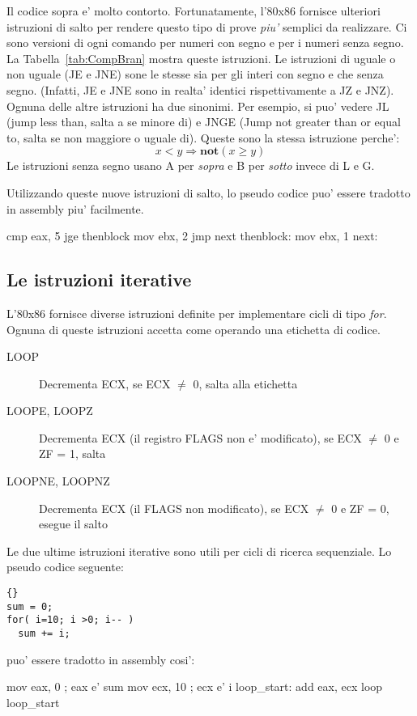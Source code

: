 Il codice sopra e' molto contorto. Fortunatamente, l'80x86 fornisce ulteriori
istruzioni di salto per rendere questo tipo di prove \emph{piu'} semplici da realizzare.
Ci sono versioni di ogni comando per numeri con segno e per i numeri senza segno.
La Tabella~\ref{tab:CompBran} mostra queste istruzioni. Le istruzioni 
di uguale o non uguale (JE e JNE) sone le stesse sia per gli interi con
segno e che senza segno. (Infatti, JE e JNE sono in realta' identici
rispettivamente a JZ e JNZ). Ognuna delle altre istruzioni ha due
sinonimi. Per esempio, si puo' vedere JL (jump less than, salta a se minore di)
e JNGE (Jump not greater than or equal to, salta se non maggiore o uguale di).
Queste sono la stessa istruzione perche': 
\[ x < y \Longrightarrow \mathbf{not}( x \geq y ) \]
Le istruzioni senza segno usano A per \emph{sopra} e B per \emph{sotto} invece
di L e G.

Utilizzando queste nuove istruzioni di salto, lo pseudo codice puo' essere
tradotto in assembly piu' facilmente. 
\begin{AsmCodeListing}[frame=none]
      cmp    eax, 5
      jge    thenblock
      mov    ebx, 2
      jmp    next
thenblock:
      mov    ebx, 1
next:
\end{AsmCodeListing}

\subsection{Le istruzioni iterative}

L'80x86 fornisce diverse istruzioni definite per implementare cicli di
tipo \emph{for}. Ognuna di queste istruzioni accetta come operando
una etichetta di codice.
\begin{description}
\item[LOOP] 
Decrementa ECX, se ECX $\neq$ 0, salta alla etichetta
\item[LOOPE, LOOPZ]
 
Decrementa ECX (il registro FLAGS non e' modificato), se
                    ECX $\neq$ 0 e ZF = 1, salta 
\item[LOOPNE, LOOPNZ]
 
Decrementa ECX (il FLAGS non modificato), se ECX $\neq$ 0
                      e ZF = 0, esegue il salto
\end{description}

Le due ultime istruzioni iterative sono utili per cicli di ricerca sequenziale.
Lo pseudo codice seguente:
\begin{lstlisting}[stepnumber=0]{}
sum = 0;
for( i=10; i >0; i-- )
  sum += i;
\end{lstlisting}
\noindent puo' essere tradotto in assembly cosi':
\begin{AsmCodeListing}[frame=none]
      mov    eax, 0          ; eax e' sum
      mov    ecx, 10         ; ecx e' i
loop_start:
      add    eax, ecx
      loop   loop_start
\end{AsmCodeListing}

